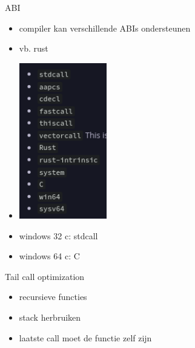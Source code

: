 \documentclass{beamer}
\begin{document}
\begin{frame}{ABI}
	\begin{itemize}
	    \item compiler kan verschillende ABIs ondersteunen
	    \item vb. rust
	    \item \includegraphics[width=0.3\textwidth]{abis.png}
	    \item windows 32 c: stdcall
	    \item windows 64 c: C
	\end{itemize}
\end{frame}

\begin{frame}{Tail call optimization}
	\begin{itemize}
	    \item recursieve functies
	    \item stack herbruiken
	    \item laatste call moet de functie zelf zijn
	\end{itemize}
\end{frame}
\end{document}
